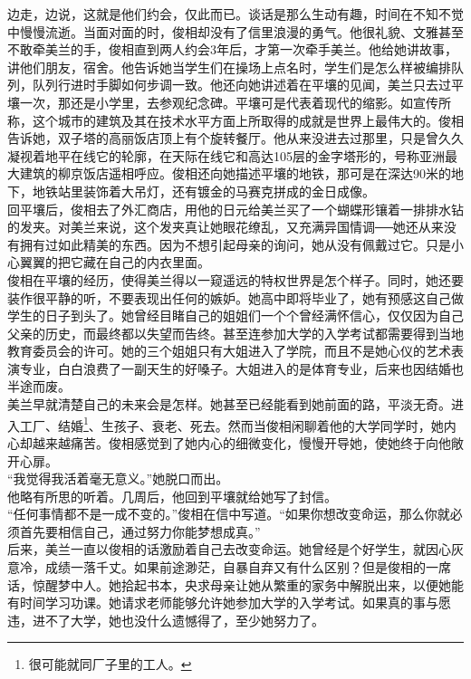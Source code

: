 \begin{multicols}{\theparacolNo}
边走，边说，这就是他们约会，仅此而已。谈话是那么生动有趣，时间在不知不觉中慢慢流逝。当面对面的时，俊相却没有了信里浪漫的勇气。他很礼貌、文雅甚至不敢牵美兰的手，俊相直到两人约会3年后，才第一次牵手美兰。他给她讲故事，讲他们朋友，宿舍。他告诉她当学生们在操场上点名时，学生们是怎么样被编排队列，队列行进时手脚如何步调一致。他还向她讲述着在平壤的见闻，美兰只去过平壤一次，那还是小学里，去参观纪念碑。平壤可是代表着现代的缩影。如宣传所称，这个城市的建筑及其在技术水平方面上所取得的成就是世界上最伟大的。俊相告诉她，双子塔的高丽饭店顶上有个旋转餐厅。他从来没进去过那里，只是曾久久凝视着地平在线它的轮廓，在天际在线它和高达105层的金字塔形的，号称亚洲最大建筑的柳京饭店遥相呼应。俊相还向她描述平壤的地铁，那可是在深达90米的地下，地铁站里装饰着大吊灯，还有镀金的马赛克拼成的金日成像。\\

回平壤后，俊相去了外汇商店，用他的日元给美兰买了一个蝴蝶形镶着一排排水钻的发夹。对美兰来说，这个发夹真让她眼花缭乱，又充满异国情调──她还从来没有拥有过如此精美的东西。因为不想引起母亲的询问，她从没有佩戴过它。只是小心翼翼的把它藏在自己的内衣里面。\\

俊相在平壤的经历，使得美兰得以一窥遥远的特权世界是怎个样子。同时，她还要装作很平静的听，不要表现出任何的嫉妒。她高中即将毕业了，她有预感这自己做学生的日子到头了。她曾经目睹自己的姐姐们一个个曾经满怀信心，仅仅因为自己父亲的历史，而最终都以失望而告终。甚至连参加大学的入学考试都需要得到当地教育委员会的许可。她的三个姐姐只有大姐进入了学院，而且不是她心仪的艺术表演专业，白白浪费了一副天生的好嗓子。大姐进入的是体育专业，后来也因结婚也半途而废。\\

美兰早就清楚自己的未来会是怎样。她甚至已经能看到她前面的路，平淡无奇。进入工厂、结婚\footnote{很可能就同厂子里的工人。}、生孩子、衰老、死去。然而当俊相闲聊着他的大学同学时，她内心却越来越痛苦。俊相感觉到了她内心的细微变化，慢慢开导她，使她终于向他敞开心扉。\\

“我觉得我活着毫无意义。”她脱口而出。\\

他略有所思的听着。几周后，他回到平壤就给她写了封信。\\

“任何事情都不是一成不变的。”俊相在信中写道。“如果你想改变命运，那么你就必须首先要相信自己，通过努力你能梦想成真。”\\

后来，美兰一直以俊相的话激励着自己去改变命运。她曾经是个好学生，就因心灰意冷，成绩一落千丈。如果前途渺茫，自暴自弃又有什么区别？但是俊相的一席话，惊醒梦中人。她拾起书本，央求母亲让她从繁重的家务中解脱出来，以便她能有时间学习功课。她请求老师能够允许她参加大学的入学考试。如果真的事与愿违，进不了大学，她也没什么遗憾得了，至少她努力了。\\


\end{multicols}
